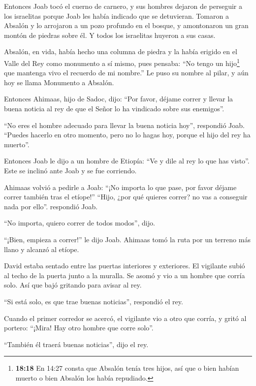  Entonces Joab tocó el cuerno de carnero, y sus hombres
dejaron de perseguir a los israelitas porque Joab les había indicado que
se detuvieran.  Tomaron a Absalón y lo arrojaron a un pozo
profundo en el bosque, y amontonaron un gran montón de piedras sobre él.
Y todos los israelitas huyeron a sus casas.

 Absalón, en vida, había hecho una columna de piedra y la
había erigido en el Valle del Rey como monumento a sí mismo, pues
pensaba: ``No tengo un hijo\footnote{\textbf{18:18} En 14:27 consta que
  Absalón tenía tres hijos, así que o bien habían muerto o bien Absalón
  los había repudiado.} que mantenga vivo el recuerdo de mi nombre.'' Le
puso su nombre al pilar, y aún hoy se llama Monumento a Absalón.

 Entonces Ahimaas, hijo de Sadoc, dijo: ``Por favor, déjame
correr y llevar la buena noticia al rey de que el Señor lo ha vindicado
sobre sus enemigos''.

 ``No eres el hombre adecuado para llevar la buena noticia
hoy'', respondió Joab. ``Puedes hacerlo en otro momento, pero no lo
hagas hoy, porque el hijo del rey ha muerto''.

 Entonces Joab le dijo a un hombre de Etiopía: ``Ve y dile
al rey lo que has visto''. Este se inclinó ante Joab y se fue corriendo.

 Ahimaas volvió a pedirle a Joab: ``¡No importa lo que
pase, por favor déjame correr también tras el etíope!'' ``Hijo, ¿por qué
quieres correr? no vas a conseguir nada por ello''. respondió Joab.

 ``No importa, quiero correr de todos modos'', dijo.

``¡Bien, empieza a correr!'' le dijo Joab. Ahimaas tomó la ruta por un
terreno más llano y alcanzó al etíope.

 David estaba sentado entre las puertas interiores y
exteriores. El vigilante subió al techo de la puerta junto a la muralla.
Se asomó y vio a un hombre que corría solo.  Así que bajó
gritando para avisar al rey.

``Si está solo, es que trae buenas noticias'', respondió el rey.

Cuando el primer corredor se acercó,  el vigilante vio a
otro que corría, y gritó al portero: ``¡Mira! Hay otro hombre que corre
solo''.

``También él traerá buenas noticias'', dijo el rey.

